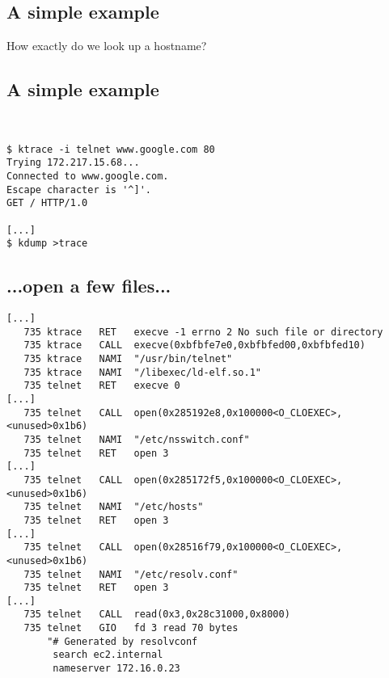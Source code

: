 \documentclass[xga]{xdvislides}
\newcommand{\smallish}{\fontsize{16}{16}\selectfont}
\begin{document}
\subsection{A simple example}
How exactly do we look up a hostname?

\subsection{A simple example}
\\
\Hugesize
\begin{center}
\begin{verbatim}
$ ktrace -i telnet www.google.com 80
Trying 172.217.15.68...
Connected to www.google.com.
Escape character is '^]'.
GET / HTTP/1.0

[...]
$ kdump >trace
\end{verbatim}
\end{center}
\Normalsize
\vspace*{\fill}

\subsection{...open a few files...}
\smallish
\begin{verbatim}
[...]
   735 ktrace   RET   execve -1 errno 2 No such file or directory
   735 ktrace   CALL  execve(0xbfbfe7e0,0xbfbfed00,0xbfbfed10)
   735 ktrace   NAMI  "/usr/bin/telnet"
   735 ktrace   NAMI  "/libexec/ld-elf.so.1"
   735 telnet   RET   execve 0
[...]
   735 telnet   CALL  open(0x285192e8,0x100000<O_CLOEXEC>,<unused>0x1b6)
   735 telnet   NAMI  "/etc/nsswitch.conf"
   735 telnet   RET   open 3
[...]
   735 telnet   CALL  open(0x285172f5,0x100000<O_CLOEXEC>,<unused>0x1b6)
   735 telnet   NAMI  "/etc/hosts"
   735 telnet   RET   open 3
[...]
   735 telnet   CALL  open(0x28516f79,0x100000<O_CLOEXEC>,<unused>0x1b6)
   735 telnet   NAMI  "/etc/resolv.conf"
   735 telnet   RET   open 3
[...]
   735 telnet   CALL  read(0x3,0x28c31000,0x8000)
   735 telnet   GIO   fd 3 read 70 bytes
       "# Generated by resolvconf
        search ec2.internal
        nameserver 172.16.0.23
\end{verbatim}
\Normalsize
\end{document}
